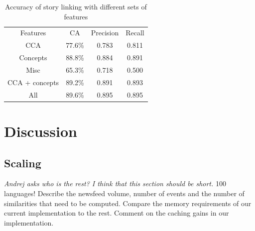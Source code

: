 \documentclass[twoside,11pt]{article}
\begin{document}
\begin{table}[h]
\caption{Accuracy of story linking with different sets of features}
\label{table:linkingEval}
\begin{center}
\begin{tabular}{|c|c|c|c|}
  \hline
  \cline{1-4}
  Features & CA & Precision & Recall \\ \cline{1-4}
  CCA & 77.6\% & 0.783 & 0.811 \\ \cline{1-4}
  Concepts & 88.8\% & 0.884 & 0.891 \\ \cline{1-4}
  Misc & 65.3\% & 0.718 & 0.500 \\ \cline{1-4}
  CCA + concepts & 89.2\% & 0.891 & 0.893 \\ \cline{1-4}
  All & 89.6\% & 0.895 & 0.895 \\ \cline{1-4}
  \hline
\end{tabular}
\end{center}
\end{table}


\section{Discussion}


\subsection{Scaling}
\emph{Andrej asks who is the rest? I think that this section should be short.}
100 languages!
Describe the newsfeed volume, number of events and the number of similarities that need to be computed. Compare the memory requirements of our current implementation to the rest.
Comment on the caching gains in our implementation.



\vskip 0.2in


\end{document}
